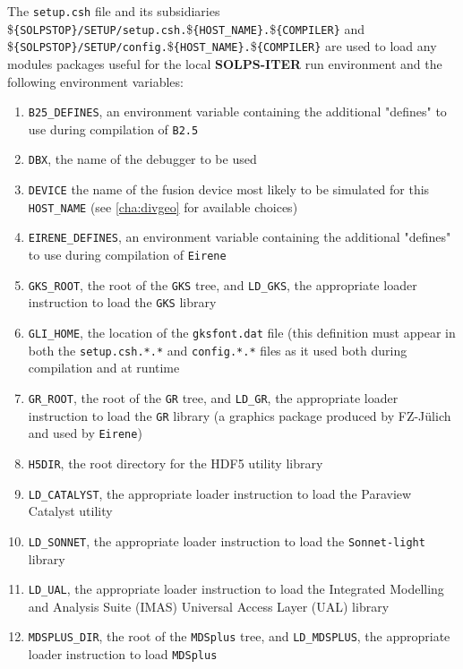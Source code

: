 \documentclass[a4paper,10pt]{report}
\newcommand\SOLPSITER{{\bf SOLPS-ITER} }
\begin{document}
The {\tt setup.csh} file and its subsidiaries \${\tt \{SOLPSTOP\}/SETUP/setup.csh.}\${\tt \{HOST\_NAME\}.}\${\tt \{COMPILER\}} and \${\tt \{SOLPSTOP\}/SETUP/config.}\${\tt \{HOST\_NAME\}.}\${\tt \{COMPILER\}} are used to load any modules packages useful for the local \SOLPSITER run environment and the following environment variables:
\begin{enumerate}
\item {\tt B25\_DEFINES}, an environment variable containing the additional
  "defines" to use during compilation of {\tt B2.5}
\item {\tt DBX}, the name of the debugger to be used
\item {\tt DEVICE} the name of the fusion device most likely to be simulated for this {\tt HOST\_NAME} (see \ref{cha:divgeo} for available choices)
\item {\tt EIRENE\_DEFINES}, an environment variable containing the additional
  "defines" to use during compilation of {\tt Eirene}
\item {\tt GKS\_ROOT}, the root of the {\tt GKS} tree, and
  {\tt LD\_GKS}, the appropriate loader instruction to load the {\tt GKS} library
\item {\tt GLI\_HOME}, the location of the {\tt gksfont.dat} file (this definition must appear in both the {\tt setup.csh.*.*} and {\tt config.*.*} files as it used both during compilation and at runtime
\item {\tt GR\_ROOT}, the root of the {\tt GR} tree, and
  {\tt LD\_GR}, the appropriate loader instruction to load the {\tt GR} library (a graphics package produced by FZ-J{\"u}lich and used by {\tt Eirene})
\item {\tt H5DIR}, the root directory for the HDF5 utility library
\item {\tt LD\_CATALYST}, the appropriate loader instruction to load the Paraview Catalyst utility
\item {\tt LD\_SONNET}, the appropriate loader instruction to load the {\tt Sonnet-light} library
\item {\tt LD\_UAL}, the appropriate loader instruction to load the Integrated Modelling and Analysis Suite (IMAS) Universal Access Layer (UAL) library
\item {\tt MDSPLUS\_DIR}, the root of the {\tt MDSplus} tree, and
  {\tt LD\_MDSPLUS}, the appropriate loader instruction to load {\tt MDSplus}

\end{enumerate}
\end{document}
